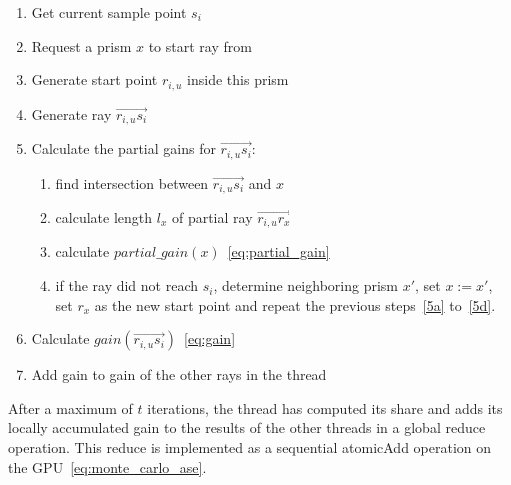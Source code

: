     \begin{enumerate}
      \item Get current sample point $s_i$
      \item Request a prism $x$ to start ray from
      \item Generate start point $r_{i,u}$ inside this prism 
      \item Generate ray $\overrightarrow{r_{i,u}s_i}$
      \item Calculate the partial gains for $\overrightarrow{r_{i,u}s_i}$:
        \begin{enumerate}
          \item find intersection between $\overrightarrow{r_{i,u}s_i}$
            and $x$\label{5a}
          \item calculate length $l_x$ of partial ray $\overrightarrow{r_{i,u}r_x}$
          \item calculate $partial\_gain(x)$~\eqref{eq:partial_gain}
          \item if the ray did not reach $s_i$, determine neighboring prism $x'$,
            set $x := x'$, set $r_x$ as the new start point and repeat the 
            previous steps~\ref{5a} to~\ref{5d}.
            \label{5d}
        \end{enumerate}
      \item Calculate $gain(\overrightarrow{r_{i,u}s_i})$~\eqref{eq:gain}
      \item Add gain to gain of the other rays in the thread
    \end{enumerate}
    After a maximum of $t$ iterations, the thread has computed its share and
    adds its locally accumulated gain to the results of the other threads in a
    global reduce operation. This reduce is implemented as a sequential
    atomicAdd operation on the GPU~\eqref{eq:monte_carlo_ase}.


